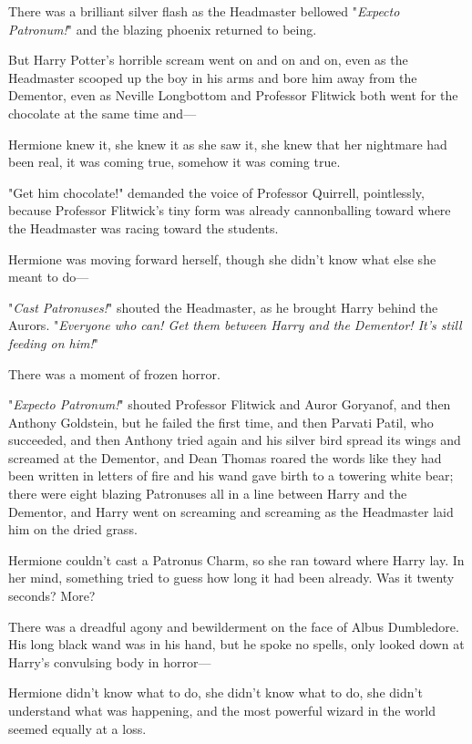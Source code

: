 There was a brilliant silver flash as the Headmaster bellowed "\emph{Expecto 
Patronum!}" and the blazing phoenix returned to being.

But Harry Potter's horrible scream went on and on and on, even as the 
Headmaster scooped up the boy in his arms and bore him away from the Dementor, 
even as Neville Longbottom and Professor Flitwick both went for the chocolate 
at the same time and---

Hermione knew it, she knew it as she saw it, she knew that her nightmare had 
been real, it was coming true, somehow it was coming true.

"Get him chocolate!" demanded the voice of Professor Quirrell, pointlessly, 
because Professor Flitwick's tiny form was already cannonballing toward where 
the Headmaster was racing toward the students.

Hermione was moving forward herself, though she didn't know what else she meant 
to do---

"\emph{Cast Patronuses!}" shouted the Headmaster, as he brought Harry behind 
the Aurors. "\emph{Everyone who can! Get them between Harry and the Dementor! 
It's still feeding on him!}"

There was a moment of frozen horror.

"\emph{Expecto Patronum!}" shouted Professor Flitwick and Auror Goryanof, and 
then Anthony Goldstein, but he failed the first time, and then Parvati Patil, 
who succeeded, and then Anthony tried again and his silver bird spread its 
wings and screamed at the Dementor, and Dean Thomas roared the words like they 
had been written in letters of fire and his wand gave birth to a towering white 
bear; there were eight blazing Patronuses all in a line between Harry and the 
Dementor, and Harry went on screaming and screaming as the Headmaster laid him 
on the dried grass.

Hermione couldn't cast a Patronus Charm, so she ran toward where Harry lay. In 
her mind, something tried to guess how long it had been already. Was it twenty 
seconds? More?

There was a dreadful agony and bewilderment on the face of Albus Dumbledore. 
His long black wand was in his hand, but he spoke no spells, only looked down 
at Harry's convulsing body in horror---

Hermione didn't know what to do, she didn't know what to do, she didn't 
understand what was happening, and the most powerful wizard in the world seemed 
equally at a loss.

